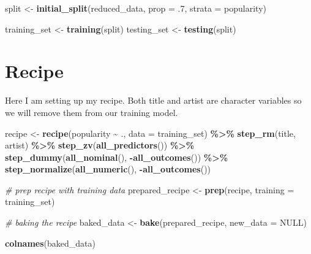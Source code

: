 \documentclass[
]{article}
\newenvironment{Shaded}{\begin{snugshade}}{\end{snugshade}}
\newcommand{\AttributeTok}[1]{\textcolor[rgb]{0.13,0.29,0.53}{#1}}
\newcommand{\CommentTok}[1]{\textcolor[rgb]{0.56,0.35,0.01}{\textit{#1}}}
\newcommand{\ConstantTok}[1]{\textcolor[rgb]{0.56,0.35,0.01}{#1}}
\newcommand{\DecValTok}[1]{\textcolor[rgb]{0.00,0.00,0.81}{#1}}
\newcommand{\FunctionTok}[1]{\textcolor[rgb]{0.13,0.29,0.53}{\textbf{#1}}}
\newcommand{\NormalTok}[1]{#1}
\newcommand{\OtherTok}[1]{\textcolor[rgb]{0.56,0.35,0.01}{#1}}
\newcommand{\SpecialCharTok}[1]{\textcolor[rgb]{0.81,0.36,0.00}{\textbf{#1}}}
\begin{document}
\begin{Shaded}
\begin{Highlighting}[]
\NormalTok{split }\OtherTok{\textless{}{-}} \FunctionTok{initial\_split}\NormalTok{(reduced\_data, }\AttributeTok{prop =}\NormalTok{ .}\DecValTok{7}\NormalTok{, }\AttributeTok{strata =}\NormalTok{ popularity)}

\NormalTok{training\_set }\OtherTok{\textless{}{-}} \FunctionTok{training}\NormalTok{(split)}
\NormalTok{testing\_set }\OtherTok{\textless{}{-}} \FunctionTok{testing}\NormalTok{(split)}
\end{Highlighting}
\end{Shaded}

\hypertarget{recipe}{%
\section{\texorpdfstring{\textbf{Recipe}}{Recipe}}\label{recipe}}

Here I am setting up my recipe. Both title and artist are character
variables so we will remove them from our training model.

\begin{Shaded}
\begin{Highlighting}[]
\NormalTok{recipe }\OtherTok{\textless{}{-}} \FunctionTok{recipe}\NormalTok{(popularity }\SpecialCharTok{\textasciitilde{}}\NormalTok{ ., }\AttributeTok{data =}\NormalTok{ training\_set) }\SpecialCharTok{\%\textgreater{}\%}
  \FunctionTok{step\_rm}\NormalTok{(title, artist) }\SpecialCharTok{\%\textgreater{}\%} 
  \FunctionTok{step\_zv}\NormalTok{(}\FunctionTok{all\_predictors}\NormalTok{()) }\SpecialCharTok{\%\textgreater{}\%}  
  \FunctionTok{step\_dummy}\NormalTok{(}\FunctionTok{all\_nominal}\NormalTok{(), }\SpecialCharTok{{-}}\FunctionTok{all\_outcomes}\NormalTok{()) }\SpecialCharTok{\%\textgreater{}\%}
  \FunctionTok{step\_normalize}\NormalTok{(}\FunctionTok{all\_numeric}\NormalTok{(), }\SpecialCharTok{{-}}\FunctionTok{all\_outcomes}\NormalTok{())}

\CommentTok{\# prep recipe with training data}
\NormalTok{prepared\_recipe }\OtherTok{\textless{}{-}} \FunctionTok{prep}\NormalTok{(recipe, }\AttributeTok{training =}\NormalTok{ training\_set)}

\CommentTok{\# baking the recipe}
\NormalTok{baked\_data }\OtherTok{\textless{}{-}} \FunctionTok{bake}\NormalTok{(prepared\_recipe, }\AttributeTok{new\_data =} \ConstantTok{NULL}\NormalTok{) }

\FunctionTok{colnames}\NormalTok{(baked\_data)}
\end{Highlighting}
\end{Shaded}
\end{document}
